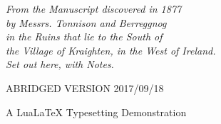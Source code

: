 \documentclass{novel} %
\begin{document}




\frontmatter %


\thispagestyle{empty}
\vspace*{6\nbs} %
{\centering{}\par}
\cleartorecto %


\thispagestyle{empty}
\vspace*{4\nbs}
{\centering{}\par}
\vspace{2\nbs} %
{\centering{}\par}
\vspace{2\nbs}
\begin{center}
\textit{From the Manuscript discovered in 1877\\
by Messrs. Tonnison and Berreggnog\\
in the Ruins that lie to the South of\\
the Village of Kraighten, in the West of Ireland.\\
Set out here, with Notes.}\par
\end{center}
\vspace{3\nbs}
{\centering{}\par}
\vspace{3\nbs}
{\centering\textsc{ABRIDGED VERSION 2017/09/18}\par}
\vfill %
{\centering A LuaLaTeX Typesetting Demonstration\par}
\clearpage
\end{document}
